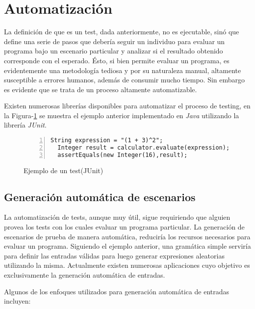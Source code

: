\section{Automatizaci\'on}
\label{sec:preliminares.testing.automation}

La definici\'on de que es un test, dada anteriormente, no es ejecutable, sin\'o que define una serie de pasos que deber\'ia seguir un individuo para evaluar un programa bajo un escenario particular y analizar si el resultado obtenido corresponde con el esperado. \'Esto, si bien permite evaluar un programa, es evidentemente una metodolog\'ia tediosa y por su naturaleza manual, altamente susceptible a errores humanos, adem\'as de consumir mucho tiempo. Sin embargo es evidente que se trata de un proceso altamente automatizable.

Existen numerosas librer\'ias disponibles para automatizar el proceso de testing, en la Figura-\ref{figures.examples.test.junit} se muestra el ejemplo anterior implementado en \emph{Java} utilizando la librer\'ia \emph{JUnit}.

\begin{figure}
	\begin{lstlisting}[frame=single, mathescape=true,numbers=left,framexleftmargin=1.5em]
  String expression = "(1 + 3)^2";
  Integer result = calculator.evaluate(expression);
  assertEquals(new Integer(16),result);
	\end{lstlisting}
	\caption{Ejemplo de un test(JUnit)}
	\label{figures.examples.test.junit}
\end{figure}

\subsection{Generaci\'on autom\'atica de escenarios}

La automatizaci\'on de tests, aunque muy \'util, sigue requiriendo que alguien provea los tests con los cuales evaluar un programa particular. La generaci\'on de escenarios de prueba de manera autom\'atica, reducir\'ia los recursos necesarios para evaluar un programa. Siguiendo el ejemplo anterior, una gram\'atica simple servir\'ia para definir las entradas v\'alidas para luego generar expresiones aleatorias utilizando la misma. Actualmente existen numerosas aplicaciones cuyo objetivo es exclusivamente la generaci\'on autom\'atica de entradas.

Algunos de los enfoques utilizados para generaci\'on autom\'atica de entradas incluyen:

